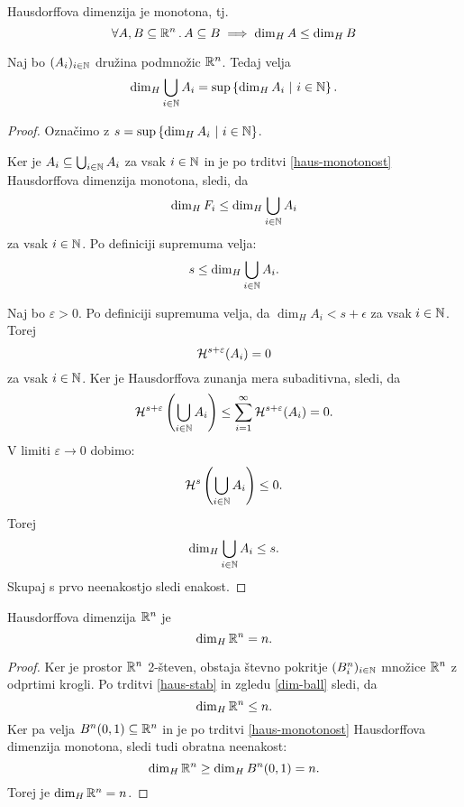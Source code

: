 \begin{trditev}[Monotonost]
    \label{haus-monotonost}
    Hausdorffova dimenzija je monotona, tj.
    \[\forall A, B \subseteq \mathbb{R}^n \,.\, A \subseteq B \implies \dim_H A \leq \dim_H B\]
\end{trditev}

\begin{trditev}
    \label{haus-stab}
    Naj bo \((A_i)_{i \in \mathbb{N}}\) družina podmnožic \(\mathbb{R}^n\). Tedaj velja 
    \[\dim_H \bigcup_{i \in \mathbb{N}} A_i = \sup \left\{\dim_H A_i \ | \ i \in \mathbb{N}\right\}.\]
\end{trditev}

\begin{proof}
    Označimo z \(s = \sup \left\{\dim_H A_i \ | \ i \in \mathbb{N}\right\}\). 
    
    Ker je \(A_i \subseteq \bigcup_{i \in \mathbb{N}} A_i\) za vsak \(i \in \mathbb{N}\) in je po trditvi \ref{haus-monotonost} Hausdorffova dimenzija monotona, sledi, da
    \[\dim_H F_i \leq \dim_H \bigcup_{i \in \mathbb{N}} A_i\]
    za vsak \(i \in \mathbb{N}\). Po definiciji supremuma velja:
    \[s \leq \dim_H \bigcup_{i \in \mathbb{N}} A_i.\]

    Naj bo \(\varepsilon > 0\). Po definiciji supremuma velja, da \(\dim_H A_i < s + \epsilon\) za vsak \(i \in \mathbb{N}\). Torej 
    \[\mathcal{H}^{s + \varepsilon}(A_i) = 0\]
    za vsak \(i \in \mathbb{N}\). Ker je Hausdorffova zunanja mera subaditivna, sledi, da
    \[\mathcal{H}^{s + \varepsilon}\left(\bigcup_{i \in \mathbb{N}} A_i\right) \leq \sum_{i=1}^{\infty} \mathcal{H}^{s + \varepsilon} (A_i) = 0.\]
    V limiti \(\varepsilon \to 0\) dobimo:
    \[\mathcal{H}^s\left(\bigcup_{i \in \mathbb{N}} A_i\right) \leq 0.\]
    Torej 
    \[\dim_H \bigcup_{i \in \mathbb{N}} A_i \leq s.\]    
    Skupaj s prvo neenakostjo sledi enakost.
\end{proof}

\begin{posledica}
    \label{dim-rn}
    Hausdorffova dimenzija \(\mathbb{R}^n\) je 
    \[\dim_H \mathbb{R}^n = n.\]
\end{posledica}

\begin{proof}
    Ker je prostor \(\mathbb{R}^n\) 2-števen, obstaja števno pokritje \((B^n_i)_{i \in \mathbb{N}}\) množice \(\mathbb{R}^n\) z odprtimi krogli. Po trditvi \ref{haus-stab} in zgledu \ref{dim-ball} sledi, da
    \[\dim_H \mathbb{R}^n \leq n.\]
    Ker pa velja \(B^n(0, 1) \subseteq \mathbb{R}^n\) in je po trditvi \ref{haus-monotonost} Hausdorffova dimenzija monotona, sledi tudi obratna neenakost:
    \[
        \dim_H \mathbb{R}^n \geq \dim_H B^n(0, 1) = n.
    \]
    Torej je \(\dim_H \mathbb{R}^n = n\).
\end{proof}

